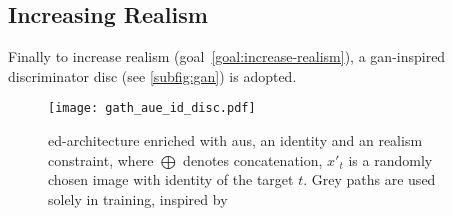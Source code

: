 \subsection{Increasing Realism}
Finally to increase realism (goal~\ref{goal:increase-realism}), a \gls{gan}-inspired
discriminator \gls{disc} (see \cref{subfig:gan}) is adopted.
\begin{figure}[htp]
    \vspace{-1em}
    \center{}
    \texttt{[image: gath\_aue\_id\_disc.pdf]}
    \caption{\gls{ed}-architecture enriched with \glspl{au}, an identity
    and an realism constraint, where \(\bigoplus\) denotes concatenation,
    \(x'_t\) is a randomly chosen image with identity of the target \(t\). Grey
    paths are used solely in training, inspired by~\cite{Mirsky.2020, Pham.2018}}\label{fig:gath-aue-id-disc}
    \vspace{-1em}
\end{figure}
